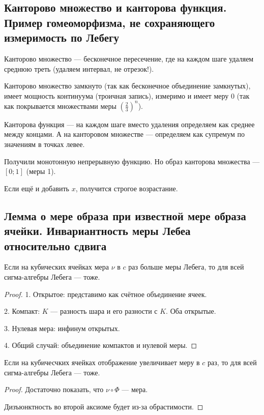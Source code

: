 \documentclass[12pt, a4paper, oneside]{memoir}
\begin{document}
\subsection{Канторово множество и канторова функция.
Пример гомеоморфизма, не сохраняющего измеримость по Лебегу}

Канторово множество — бесконечное пересечение, где на каждом шаге удаляем среднюю треть
(удаляем интервал, не отрезок!).

Канторово множество замкнуто (так как бесконечное объединение замкнутых), имеет мощность континуума (троичная запись), измеримо и имеет меру 0
(так как покрывается множествами меры $\left(\frac{2}{3}\right)^n$).

Канторова функция — на каждом шаге вместо удаления определяем как среднее между концами.
А на канторовом множестве — определяем как супремум по значениям в точках левее.

Получили монотонную непрерывную функцию. Но образ канторова множества — $[0; 1]$ (меры 1).

Если ещё и добавить $x$, получится строгое возрастание.

\subsection{Лемма о мере образа при известной мере образа ячейки.
Инвариантность меры Лебеа относительно сдвига}

\begin{lemma}

    Если на кубических ячейках мера $\nu$ в $c$ раз больше меры Лебега,
    то для всей сигма-алгебры Лебега — тоже.

    \begin{proof}
        1. Открытое: представимо как счётное объединение ячеек.
        
        2. Компакт: $K$ — разность шара и его разности с $K$. Оба открытые.

        3. Нулевая мера: инфинум открытых.

        4. Общий случай: объединение компактов и нулевой меры.
    \end{proof}
\end{lemma}

\begin{corollary}
        Если на кубичесчких ячейках отображение увеличивает меру в $c$ раз,
        то для всей сигма-алгебры Лебега — тоже.

        \begin{proof}
            Достаточно показать, что $\nu \circ \Phi$ — мера.

            Дизъюнктность во второй аксиоме будет из-за обрастимости.
        \end{proof}
\end{corollary}
\end{document}
